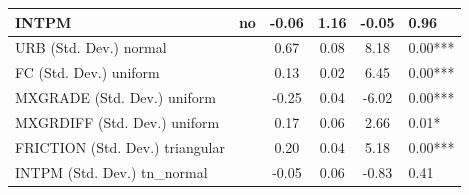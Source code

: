 \begin{table}
\begin{center}
\begin{tabular}{|l|l|c|c|c|l|}
			\hline
			INTPM & no & -0.06 & 1.16 & -0.05 & 0.96 \\
			\hline
			URB (Std. Dev.) normal &  & 0.67 & 0.08 & 8.18 & 0.00*** \\
			\hline
			FC (Std. Dev.) uniform &  & 0.13 & 0.02 & 6.45 & 0.00*** \\
			\hline
			MXGRADE (Std. Dev.) uniform &  & -0.25 & 0.04 & -6.02 & 0.00*** \\
			\hline
			MXGRDIFF (Std. Dev.) uniform &  & 0.17 & 0.06 & 2.66 & 0.01* \\
			\hline
			FRICTION (Std. Dev.) triangular &  & 0.20 & 0.04 & 5.18 & 0.00*** \\
			\hline
			INTPM (Std. Dev.) tn_normal &  & -0.05 & 0.06 & -0.83 & 0.41 \\
			\hline
		\end{tabular}
	\end{center}
\end{table}